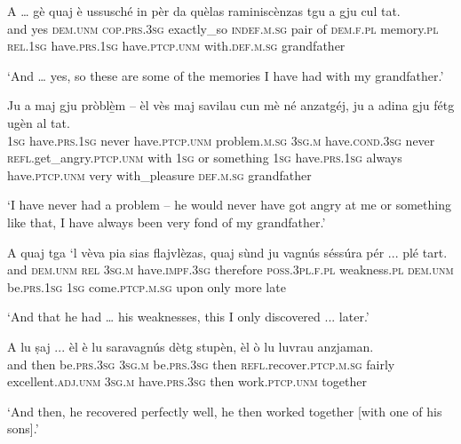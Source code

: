 \begin{linenumbers}
\gll  A … gè quaj è ussusché in pèr da quèlas raminiscènzas tgu a gju cul tat.\\
and {} yes  \textsc{dem.unm} \textsc{cop.prs.3sg} exactly\_so  \textsc{indef.m.sg} pair of  \textsc{dem.f.pl} memory.\textsc{pl}  \textsc{rel.1sg} have.\textsc{prs.1sg} have.\textsc{ptcp.unm}  with.\textsc{def.m.sg} grandfather \\
\end{linenumbers}
\medskip
\glt `And … yes, so these are some of the memories I have had with my grandfather.'
\medskip

\begin{linenumbers}
\gll Ju a maj gju pròblè̱m – èl vès maj savilau cun mè né anzatgéj, ju a adina gju fétg ugèn al tat.   \\
 \textsc{1sg} have.\textsc{prs.1sg} never have.\textsc{ptcp.unm} problem.\textsc{m.sg} {} \textsc{3sg.m} have.\textsc{cond.3sg} never \textsc{refl}.get\_angry.\textsc{ptcp.unm} with \textsc{1sg} or something \textsc{1sg} have.\textsc{prs.1sg} always have.\textsc{ptcp.unm} very with\_pleasure \textsc{def.m.sg} grandfather\\
\end{linenumbers}
\medskip
\glt `I have never had a problem – he would never have got angry at me or something like that, I have always been very fond of my grandfather.'
\medskip

\begin{linenumbers}
\gll A quaj tga `l vèva pia sias flajvlèzas, quaj sùnd ju vagnús séssúra pér ... plé tart.   \\
and \textsc{dem.unm} \textsc{rel} \textsc{3sg.m} have.\textsc{impf.3sg} therefore \textsc{poss.3pl.f.pl} weakness.\textsc{pl} \textsc{dem.unm} be.\textsc{prs.1sg} \textsc{1sg} come.\textsc{ptcp.m.sg} upon only {} more late\\
\end{linenumbers}
\medskip
\glt `And that he had … his weaknesses, this I only discovered ... later.'
\medskip

\begin{linenumbers}
\gll A lu ṣaj ... èl è lu saravagnús dètg stupèn, èl ò lu luvrau anzjaman.   \\
and then be.\textsc{prs.3sg} {} \textsc{3sg.m} be.\textsc{prs.3sg} then \textsc{refl}.recover.\textsc{ptcp.m.sg} fairly  excellent.\textsc{adj.unm} \textsc{3sg.m} have.\textsc{prs.3sg} then work.\textsc{ptcp.unm} together  \\
\end{linenumbers}
\medskip
\glt `And then, he recovered perfectly well, he then worked together [with one of his sons].'
\medskip

